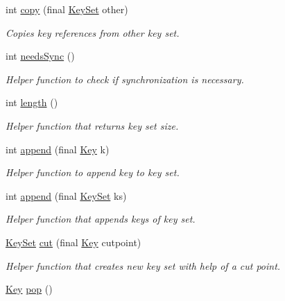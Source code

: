 \begin{DoxyCompactItemize}
int \hyperlink{classorg_1_1libelektra_1_1KeySet_a32cba0dbe638373296fb242a698ad1cb}{copy} (final \hyperlink{classorg_1_1libelektra_1_1KeySet}{Key\+Set} other)
\begin{DoxyCompactList}\small\item\em Copies key references from other key set. \end{DoxyCompactList}\item 
int \hyperlink{classorg_1_1libelektra_1_1KeySet_a9a21c729da19bc6fb2e7f33fe06ee15e}{needs\+Sync} ()
\begin{DoxyCompactList}\small\item\em Helper function to check if synchronization is necessary. \end{DoxyCompactList}\item 
int \hyperlink{classorg_1_1libelektra_1_1KeySet_aac3920fa38179de07bcd242207915540}{length} ()
\begin{DoxyCompactList}\small\item\em Helper function that returns key set size. \end{DoxyCompactList}\item 
int \hyperlink{classorg_1_1libelektra_1_1KeySet_a5c1738709f8ccda0929204c9151e773e}{append} (final \hyperlink{classorg_1_1libelektra_1_1Key}{Key} k)
\begin{DoxyCompactList}\small\item\em Helper function to append key to key set. \end{DoxyCompactList}\item 
int \hyperlink{classorg_1_1libelektra_1_1KeySet_a383722346ce590f7bc00aae82c1d035d}{append} (final \hyperlink{classorg_1_1libelektra_1_1KeySet}{Key\+Set} ks)
\begin{DoxyCompactList}\small\item\em Helper function that appends keys of key set. \end{DoxyCompactList}\item 
\hyperlink{classorg_1_1libelektra_1_1KeySet}{Key\+Set} \hyperlink{classorg_1_1libelektra_1_1KeySet_a470743c3a6f873427d057c6ce7e3661c}{cut} (final \hyperlink{classorg_1_1libelektra_1_1Key}{Key} cutpoint)
\begin{DoxyCompactList}\small\item\em Helper function that creates new key set with help of a cut point. \end{DoxyCompactList}\item 
\hyperlink{classorg_1_1libelektra_1_1Key}{Key} \hyperlink{classorg_1_1libelektra_1_1KeySet_a6fcb652d72c64772bae40ec801d93ad9}{pop} ()

\end{DoxyCompactItemize}
